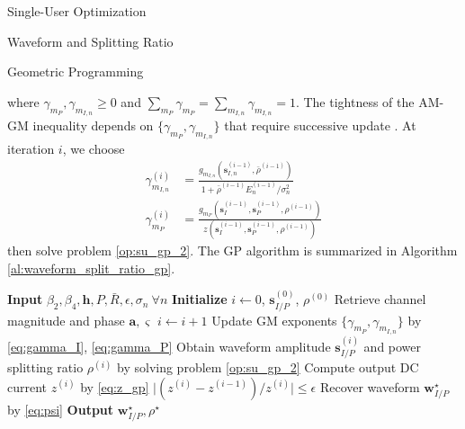 \documentclass{IEEEtran}
\begin{document}
\begin{section}{Single-User Optimization}
\begin{subsection}{Waveform and Splitting Ratio}
\begin{subsubsection}{Geometric Programming}
\begin{mini}
			\end{mini}
			where $\gamma_{m_P},\gamma_{m_{I,n}} \ge 0$ and $\sum_{m_P}\gamma_{m_P}=\sum_{m_{I,n}}\gamma_{m_{I,n}}=1$. The tightness of the AM-GM inequality depends on $\{\gamma_{m_P},\gamma_{m_{I,n}}\}$ that require successive update \cite{Clerckx2018b}. At iteration $i$, we choose
			\begin{align}
				\gamma_{m_{I,n}}^{(i)} & = \frac{g_{m_{I,n}}(\boldsymbol{s}_{I,n}^{(i-1)},\bar{\rho}^{(i-1)})}{1+{\bar{\rho}^{(i-1)}E_n^{(i-1)}}/{\sigma_n^2}}\label{eq:gamma_I}\\
				\gamma_{m_P}^{(i)} & = \frac{g_{m_P}(\boldsymbol{s}_I^{(i-1)},\boldsymbol{s}_P^{(i-1)},\rho^{(i-1)})}{z(\boldsymbol{s}_I^{(i-1)},\boldsymbol{s}_P^{(i-1)},\rho^{(i-1)})}\label{eq:gamma_P}
			\end{align}
			then solve problem \ref{op:su_gp_2}. The GP algorithm is summarized in Algorithm \ref{al:waveform_split_ratio_gp}.
			\begin{algorithm}
				\caption{GP: Waveform and Splitting Ratio}
				\label{al:waveform_split_ratio_gp}
				\begin{algorithmic}[1]
					\State \textbf{Input} $\beta_2,\beta_4,\boldsymbol{h},P,\bar{R},\epsilon,\sigma_n \ \forall n$
					\State \textbf{Initialize} $i \gets 0$, $\boldsymbol{s}_{I/P}^{(0)}$, $\rho^{(0)}$
					\State Retrieve channel magnitude and phase $\boldsymbol{a}, \varsigma$
					\Repeat
					\State $i \gets i + 1$
					\State Update GM exponents $\{\gamma_{m_P},\gamma_{m_{I,n}}\}$ by \ref{eq:gamma_I}, \ref{eq:gamma_P}
					\State Obtain waveform amplitude $\boldsymbol{s}_{I/P}^{(i)}$ and power splitting ratio $\rho^{(i)}$ by solving problem \ref{op:su_gp_2}
					\State Compute output DC current $z^{(i)}$ by \ref{eq:z_gp}
					\Until $\lvert (z^{(i)} - z^{(i-1)}) / z^{(i)} \rvert \le \epsilon$
					\State Recover waveform $\boldsymbol{w}_{I/P}^{\star}$ by \ref{eq:psi}
					\State \textbf{Output} $\boldsymbol{w}_{I/P}^{\star}, \rho^{\star}$
				\end{algorithmic}
			\end{algorithm}
		\end{subsubsection}


\end{subsection}
\end{section}
\end{document}
